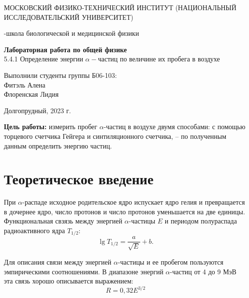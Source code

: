 \documentclass{article}
\begin{document}
\def\figurename{Рисунок}
\begin{titlepage}
\begin{center}
    {\large МОСКОВСКИЙ ФИЗИКО-ТЕХНИЧЕСКИЙ ИНСТИТУТ (НАЦИОНАЛЬНЫЙ ИССЛЕДОВАТЕЛЬСКИЙ УНИВЕРСИТЕТ)}
\end{center}
\begin{center}
    {-школа биологической и медицинской физики}
\end{center}

\vspace{1cm}
{\huge
\begin{center}
    {\bf Лабораторная работа по общей физике}\\
    \vspace{0.5cm}
    5.4.1 Определение энергии $\alpha-$частиц по величине их пробега в воздухе
\end{center}
}

\vspace{4cm}
\begin{flushright}
{\LARGE Выполнили студенты группы Б06-103:\\ Фитэль Алена \\Флоренская Лидия\\}

\end{flushright}
\vspace{9cm}
\begin{center}
    Долгопрудный, 2023 г.
\end{center}
\end{titlepage}



\newpage
	\textbf{Цель работы:} измерить пробег $\alpha$-частиц в воздухе двумя способами: с помощью торцевого счетчика Гейгера и синтиляционного счетчика, -- по полученным данным определить энергию частиц.

\section{Теоретическое введение}
	При $\alpha$-распаде исходное родительское ядро испускает ядро гелия и превращается в дочернее ядро, число протонов и число протонов уменьшается на две единицы. Функциональная свзязь между энергией $\alpha$-частицы $E$ и периодом полураспада радиоактивного ядра $T_{1/2}$:
	\begin{equation*}
		 \lg T_{1/2} = \frac{a}{\sqrt{E}} + b.
	\end{equation*}
	
	Для описания связи между энергией $\alpha$-частицы и ее пробегом пользуются эмпирическими соотношениями. В диапазоне энергий $\alpha$-частиц от 4 до 9 МэВ эта связь хорошо описывается выражением:
	\begin{equation*}
		\label{eq:R(E)}
		\tag{$\star$}
		R = 0,32E^{3/2}
	\end{equation*}
	
\end{document}
